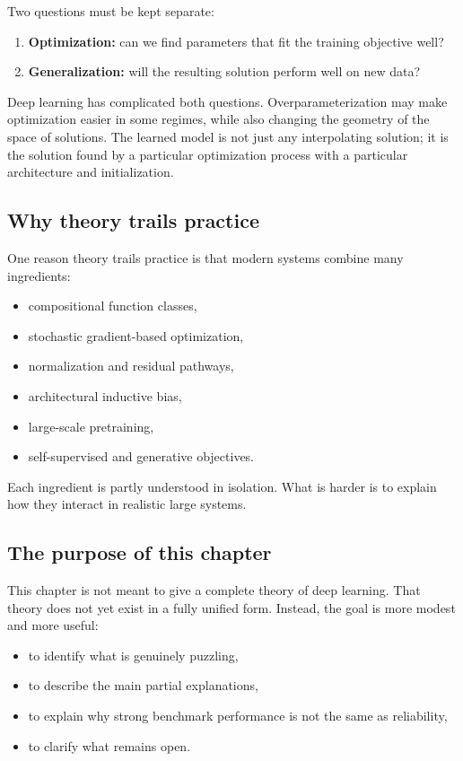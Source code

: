 Two questions must be kept separate:
\begin{enumerate}
    \item \textbf{Optimization:} can we find parameters that fit the training objective well?
    \item \textbf{Generalization:} will the resulting solution perform well on new data?
\end{enumerate}

Deep learning has complicated both questions.
Overparameterization may make optimization easier in some regimes, while also changing the geometry of the space of solutions.
The learned model is not just any interpolating solution; it is the solution found by a particular optimization process with a particular architecture and initialization.

\subsection*{Why theory trails practice}

One reason theory trails practice is that modern systems combine many ingredients:
\begin{itemize}
    \item compositional function classes,
    \item stochastic gradient-based optimization,
    \item normalization and residual pathways,
    \item architectural inductive bias,
    \item large-scale pretraining,
    \item self-supervised and generative objectives.
\end{itemize}

Each ingredient is partly understood in isolation.
What is harder is to explain how they interact in realistic large systems.

\subsection*{The purpose of this chapter}

This chapter is not meant to give a complete theory of deep learning.
That theory does not yet exist in a fully unified form.
Instead, the goal is more modest and more useful:
\begin{itemize}
    \item to identify what is genuinely puzzling,
    \item to describe the main partial explanations,
    \item to explain why strong benchmark performance is not the same as reliability,
    \item to clarify what remains open.
\end{itemize}

